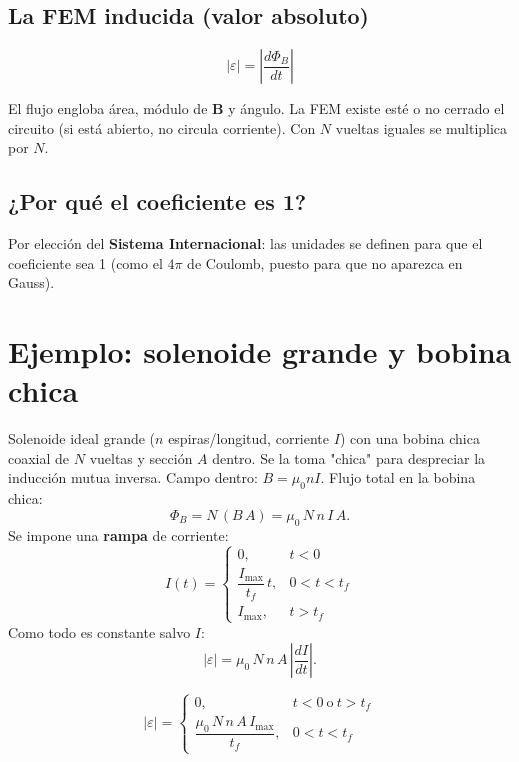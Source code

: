 \documentclass[12pt,a4paper]{article}
\begin{document}


\subsection{La FEM inducida (valor absoluto)}

\begin{keybox}
  \[
  \boxed{|\varepsilon| = \left|\frac{d\Phi_B}{dt}\right|}
  \]
\end{keybox}

El flujo engloba área, módulo de $\mathbf{B}$ y ángulo. La FEM existe esté o no
cerrado el circuito (si está abierto, no circula corriente). Con $N$ vueltas
iguales se multiplica por $N$.

\subsection{¿Por qué el coeficiente es 1?}

Por elección del \textbf{Sistema Internacional}: las unidades se definen para
que el coeficiente sea 1 (como el $4\pi$ de Coulomb, puesto para que no
aparezca en Gauss).

\section{Ejemplo: solenoide grande y bobina chica}

Solenoide ideal grande ($n$ espiras/longitud, corriente $I$) con una bobina
chica coaxial de $N$ vueltas y sección $A$ dentro. Se la toma "chica" para
despreciar la inducción mutua inversa. Campo dentro: $B = \mu_0 n I$. Flujo
total en la bobina chica:
\[
\Phi_B = N\,(B\,A) = \mu_0\, N\, n\, I\, A.
\]
Se impone una \textbf{rampa} de corriente:
\[
I(t) = \begin{cases} 0, & t<0 \\ \dfrac{I_{\max}}{t_f}\,t, & 0<t<t_f \\
I_{\max}, & t>t_f \end{cases}
\]
Como todo es constante salvo $I$:
\[
|\varepsilon| = \mu_0\, N\, n\, A\,\left|\frac{dI}{dt}\right|.
\]

\begin{keybox}
  \[
  \boxed{|\varepsilon| = \begin{cases} 0, & t<0 \ \text{o}\ t>t_f \\[1mm]
  \dfrac{\mu_0\, N\, n\, A\, I_{\max}}{t_f}, & 0<t<t_f \end{cases}}
  \]
\end{keybox}
\end{document}
